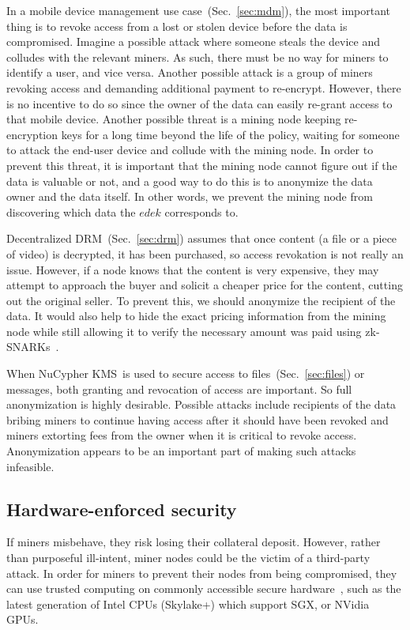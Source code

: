\documentclass[longbibliography,nofootinbib]{revtex4-1}
\newcommand{\kms}{NuCypher KMS}
\begin{document}
In a mobile device management use case~(Sec.~\ref{sec:mdm}),
the most important thing is to revoke access from a lost or stolen device before the data is compromised.
Imagine a possible attack where someone steals the device and colludes with the relevant miners.
As such, there must be no way for miners to identify a user, and vice versa.
Another possible attack is a group of miners revoking access and demanding additional payment to re-encrypt.
However, there is no incentive to do so since the owner of the data can easily re-grant access to that mobile device.
Another possible threat is a mining node keeping re-encryption keys for a long time beyond the life of the policy,
waiting for someone to attack the end-user device and collude with the mining node.
In order to prevent this threat, it is important that the mining node cannot figure out if the data is valuable or not,
and a good way to do this is to anonymize the data owner and the data itself.
In other words, we prevent the mining node from discovering which data the $edek$ corresponds to.

Decentralized DRM~(Sec.~\ref{sec:drm}) assumes that once content (a file or a piece of video) is decrypted, it has been purchased,
so access revokation is not really an issue.
However, if a node knows that the content is very expensive, they may attempt to approach the buyer and solicit a cheaper price for the
content, cutting out the original seller.
To prevent this, we should anonymize the recipient of the data.
It would also help to hide the exact pricing information from the mining node while still allowing it to verify the necessary amount was paid using
zk-SNARKs~\cite{consensys-snarks}.

When \kms~is used to secure access to files~(Sec.~\ref{sec:files}) or messages, both granting and revocation of access are important.
So full anonymization is highly desirable.
Possible attacks include recipients of the data bribing miners to continue having access after it should have been revoked and
miners extorting fees from the owner when it is critical to revoke access.
Anonymization appears to be an important part of making such attacks infeasible.

\subsection{Hardware-enforced security}

If miners misbehave, they risk losing their collateral deposit.
However, rather than purposeful ill-intent, miner nodes could be the victim of a third-party attack.
In order for miners to prevent their nodes from being compromised, they can use trusted computing on commonly accessible secure hardware~\cite{Yang2011},
such as the latest generation of Intel CPUs (Skylake+) which support SGX, or NVidia GPUs.
\end{document}
